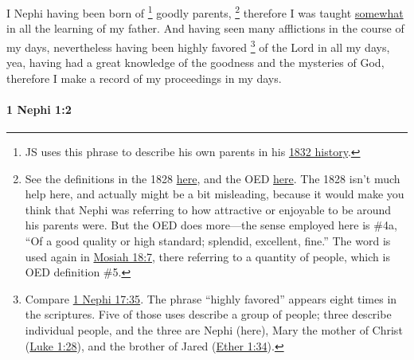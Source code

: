 			I Nephi having been born of
				\footnote{%
					JS uses this phrase to describe his own parents in his \hyperlink{EMS-1832-JS-CIR-SUM-1832-c}{1832 history}.
					}%
			goodly parents,%
				\footnote{%
					See the definitions in the 1828 \hyperref[GOODLY-1828]{here}, and the OED \hyperref[GOODLY-OED]{here}. The 1828 isn't much help here, and actually might be a bit misleading, because it would make you think that Nephi was referring to how attractive or enjoyable to be around his parents were. But the OED does more---the sense employed here is \#4a, ``Of a good quality or high standard; splendid, excellent, fine.'' The word is used again in \hyperref[MOSIAH-18-7]{Mosiah 18:7}, there referring to a quantity of people, which is OED definition \#5.
					}
			therefore I was taught \hyperref[SOMEWHAT]{somewhat} in all the learning of my father.
			And having seen many afflictions in the course of my days,
			nevertheless having been highly favored%
			\footnote{%
				Compare \hyperref[1NEPHI-17-35]{1 Nephi 17:35}. The phrase ``highly favored'' appears eight times in the scriptures. Five of those uses describe a group of people; three describe individual people, and the three are Nephi (here), Mary the mother of Christ (\hyperref[LUKE-1-28]{Luke 1:28}), and the brother of Jared (\hyperref[ETHER-1-34]{Ether 1:34}).
				}
			of the Lord in all my days,
			yea, having had a great knowledge of the goodness and the mysteries of God,
			therefore I make a record of my proceedings in my days.
			
		\paragraph{1 Nephi 1:2} %
			\label{1NEPHI-1-2}

